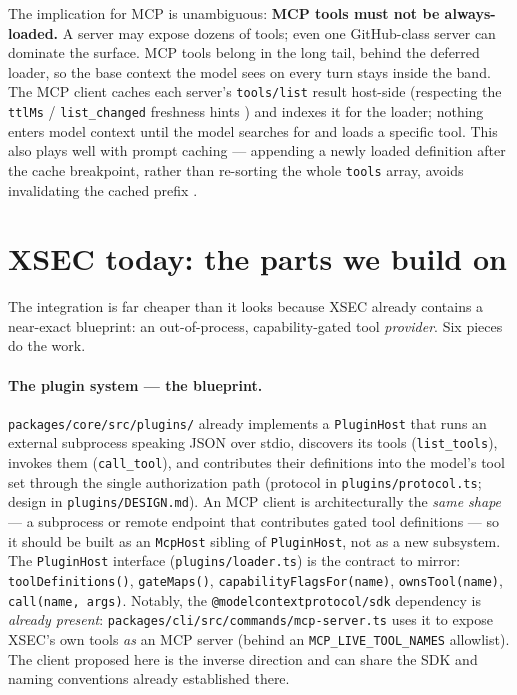 \documentclass[11pt]{article}
\begin{document}
The implication for MCP is unambiguous: \textbf{MCP tools must not be
always-loaded.} A server may expose dozens of tools; even one GitHub-class
server can dominate the surface. MCP tools belong in the long tail, behind the
deferred loader, so the base context the model sees on every turn stays inside
the band. The MCP client caches each server's \texttt{tools/list} result
host-side (respecting the \texttt{ttlMs} / \texttt{list\_changed} freshness
hints \cite{mcp-clientbp}) and indexes it for the loader; nothing enters model
context until the model searches for and loads a specific tool. This also plays
well with prompt caching --- appending a newly loaded definition after the cache
breakpoint, rather than re-sorting the whole \texttt{tools} array, avoids
invalidating the cached prefix \cite{mcp-clientbp}.

\section{XSEC today: the parts we build on}

The integration is far cheaper than it looks because XSEC already contains a
near-exact blueprint: an out-of-process, capability-gated tool \emph{provider}.
Six pieces do the work.

\paragraph{The plugin system --- the blueprint.} \texttt{packages/core/src/plugins/}
already implements a \texttt{PluginHost} that runs an external subprocess
speaking JSON over stdio, discovers its tools (\texttt{list\_tools}), invokes
them (\texttt{call\_tool}), and contributes their definitions into the model's
tool set through the single authorization path (protocol in
\texttt{plugins/protocol.ts}; design in \texttt{plugins/DESIGN.md}). An MCP client
is architecturally the \emph{same shape} --- a subprocess or remote endpoint that
contributes gated tool definitions --- so it should be built as an
\texttt{McpHost} sibling of \texttt{PluginHost}, not as a new subsystem. The
\texttt{PluginHost} interface (\texttt{plugins/loader.ts}) is the contract to
mirror: \texttt{toolDefinitions()}, \texttt{gateMaps()},
\texttt{capabilityFlagsFor(name)}, \texttt{ownsTool(name)},
\texttt{call(name, args)}. Notably, the \texttt{@modelcontextprotocol/sdk}
dependency is \emph{already present}: \texttt{packages/cli/src/commands/mcp-server.ts}
uses it to expose XSEC's own tools \emph{as} an MCP server (behind an
\texttt{MCP\_LIVE\_TOOL\_NAMES} allowlist). The client proposed here is the
inverse direction and can share the SDK and naming conventions already
established there.
\end{document}
